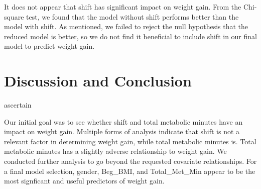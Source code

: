 \documentclass[]{article}
\begin{document}
It does not appear that shift has significant impact on weight gain.
From the Chi-square test, we found that the model without shift performs
better than the model with shift. As mentioned, we failed to reject the
null hypothesis that the reduced model is better, so we do not find it
beneficial to include shift in our final model to predict weight gain.

\hypertarget{discussion-and-conclusion}{%
\section{Discussion and Conclusion}\label{discussion-and-conclusion}}

ascertain

Our initial goal was to see whether shift and total metabolic minutes
have an impact on weight gain. Multiple forms of analysis indicate that
shift is not a relevant factor in determining weight gain, while total
metabolic minutes is. Total metabolic minutes has a slightly adverse
relationship to weight gain. We conducted further analysis to go beyond
the requested covariate relationships. For a final model selection,
gender, Beg\_BMI, and Total\_Met\_Min appear to be the most signficant
and useful predictors of weight gain.
\end{document}
